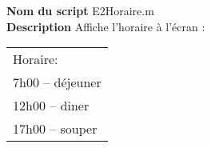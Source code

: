 \textbf{Nom du script}
E2Horaire.m\\
\textbf{Description}
Affiche l'horaire à l'écran : \\ \begin{tabular}{ | l | } \hline Horaire:          \\ 7h00 – déjeuner \\ 12h00 – diner    \\ 17h00 – souper   \\ \hline \end{tabular}